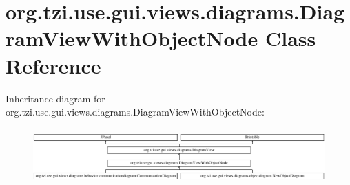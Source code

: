\hypertarget{classorg_1_1tzi_1_1use_1_1gui_1_1views_1_1diagrams_1_1_diagram_view_with_object_node}{\section{org.\-tzi.\-use.\-gui.\-views.\-diagrams.\-Diagram\-View\-With\-Object\-Node Class Reference}
\label{classorg_1_1tzi_1_1use_1_1gui_1_1views_1_1diagrams_1_1_diagram_view_with_object_node}
}
Inheritance diagram for org.\-tzi.\-use.\-gui.\-views.\-diagrams.\-Diagram\-View\-With\-Object\-Node\-:\begin{figure}[H]
\begin{center}
\leavevmode
\includegraphics[height=2.183236cm]{classorg_1_1tzi_1_1use_1_1gui_1_1views_1_1diagrams_1_1_diagram_view_with_object_node}
\end{center}
\end{figure}
